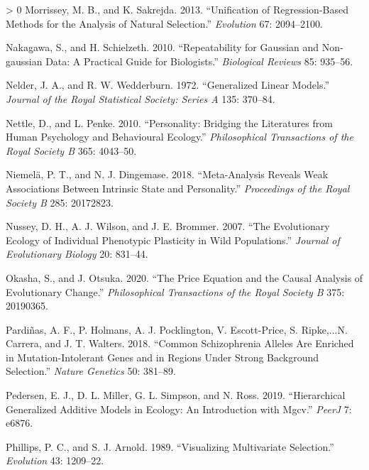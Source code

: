 \documentclass{article}
\newlength{\cslhangindent}
\newenvironment{CSLReferences}[3] %
 {%
  \setlength{\parindent}{0pt}
  \ifodd #1 \everypar{\setlength{\hangindent}{\cslhangindent}}\ignorespaces\fi
  \ifnum #2 > 0
  \setlength{\parskip}{#2\baselineskip}
  \fi
 }%
 {}
\begin{document}
\begin{CSLReferences}{1}{0}
\leavevmode\hypertarget{ref-Morrissey2013}{}%
Morrissey, M. B., and K. Sakrejda. 2013. {``Unification of
Regression-Based Methods for the Analysis of Natural Selection.''}
\emph{Evolution} 67: 2094--2100.

\leavevmode\hypertarget{ref-Naka2010}{}%
Nakagawa, S., and H. Schielzeth. 2010. {``Repeatability for Gaussian and
Non‐gaussian Data: A Practical Guide for Biologists.''} \emph{Biological
Reviews} 85: 935--56.

\leavevmode\hypertarget{ref-Nelder1972}{}%
Nelder, J. A., and R. W. Wedderburn. 1972. {``Generalized Linear
Models.''} \emph{Journal of the Royal Statistical Society: Series A}
135: 370--84.

\leavevmode\hypertarget{ref-Nettle2010}{}%
Nettle, D., and L. Penke. 2010. {``Personality: Bridging the Literatures
from Human Psychology and Behavioural Ecology.''} \emph{Philosophical
Transactions of the Royal Society B} 365: 4043--50.

\leavevmode\hypertarget{ref-Niem2018}{}%
Niemelä, P. T., and N. J. Dingemase. 2018. {``Meta-Analysis Reveals Weak
Associations Between Intrinsic State and Personality.''}
\emph{Proceedings of the Royal Society B} 285: 20172823.

\leavevmode\hypertarget{ref-Nus2007}{}%
Nussey, D. H., A. J. Wilson, and J. E. Brommer. 2007. {``The
Evolutionary Ecology of Individual Phenotypic Plasticity in Wild
Populations.''} \emph{Journal of Evolutionary Biology} 20: 831--44.

\leavevmode\hypertarget{ref-Okasha2020}{}%
Okasha, S., and J. Otsuka. 2020. {``The Price Equation and the Causal
Analysis of Evolutionary Change.''} \emph{Philosophical Transactions of
the Royal Society B} 375: 20190365.

\leavevmode\hypertarget{ref-Pard2018}{}%
Pardiñas, A. F., P. Holmans, A. J. Pocklington, V. Escott-Price, S.
Ripke,...N. Carrera, and J. T. Walters. 2018. {``Common Schizophrenia
Alleles Are Enriched in Mutation-Intolerant Genes and in Regions Under
Strong Background Selection.''} \emph{Nature Genetics} 50: 381--89.

\leavevmode\hypertarget{ref-Pedersen2019}{}%
Pedersen, E. J., D. L. Miller, G. L. Simpson, and N. Ross. 2019.
{``Hierarchical Generalized Additive Models in Ecology: An Introduction
with Mgcv.''} \emph{PeerJ} 7: e6876.

\leavevmode\hypertarget{ref-Phillips1989}{}%
Phillips, P. C., and S. J. Arnold. 1989. {``Visualizing Multivariate
Selection.''} \emph{Evolution} 43: 1209--22.


\end{CSLReferences}
\end{document}
